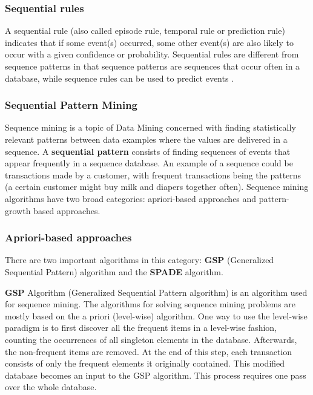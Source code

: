 \subsubsection*{Sequential rules}
A sequential rule (also called episode rule, temporal rule or prediction rule) indicates that if some event(s) occurred, some other event(s) are also likely to occur with a given confidence or probability. Sequential rules are different from sequence patterns in that sequence patterns are sequences that occur often in a database, while sequence rules can be used to predict events \cite{fournier2011rulegrowth}.

\subsubsection{Sequential Pattern Mining}
Sequence mining is a topic of Data Mining concerned with finding statistically relevant patterns between data examples where the values are delivered in a sequence. A \textbf{sequential pattern} consists of finding sequences of events that appear frequently in a sequence database. An example of a sequence could be transactions made by a customer, with frequent transactions being the patterns (a certain customer might buy milk and diapers together often). Sequence mining algorithms have two broad categories: apriori-based approaches and pattern-growth based approaches.

\subsubsection*{Apriori-based approaches} 

There are two important algorithms in this category: \textbf{GSP} (Generalized Sequential Pattern) algorithm and the \textbf{SPADE} algorithm. 

\textbf{GSP} Algorithm (Generalized Sequential Pattern algorithm) \cite{srikant1996mining} is an algorithm used for sequence mining. The algorithms for solving sequence mining problems are mostly based on the a priori (level-wise) algorithm. One way to use the level-wise paradigm is to first discover all the frequent items in a level-wise fashion, counting the occurrences of all singleton elements in the database. Afterwards, the non-frequent items are removed. At the end of this step, each transaction consists of only the frequent elements it originally contained. This modified database becomes an input to the GSP algorithm. This process requires one pass over the whole database. 

